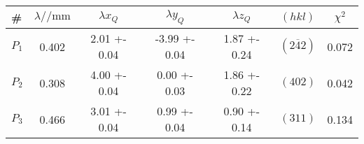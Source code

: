 \begin{tabular}{lSSSScS}
\toprule

{\#} & {$\lambda /\si{\per\milli\metre}$} & {$\lambda x_Q$} & {$\lambda y_Q$} & {$\lambda z_Q$} & {$(hkl)$} & {$\chi^2$}\\

\midrule

$P_1$ & 0.402 & 2.01 +- 0.04 & -3.99 +- 0.04 & 1.87 +- 0.24 & $(2\overline{4}2)$ & 0.072\\
$P_2$ & 0.308 & 4.00 +- 0.04 & 0.00 +- 0.03 & 1.86 +- 0.22 & $(402)$ & 0.042\\
$P_3$ & 0.466 & 3.01 +- 0.04 & 0.99 +- 0.04 & 0.90 +- 0.14 & $(311)$ & 0.134\\

\bottomrule
\end{tabular}